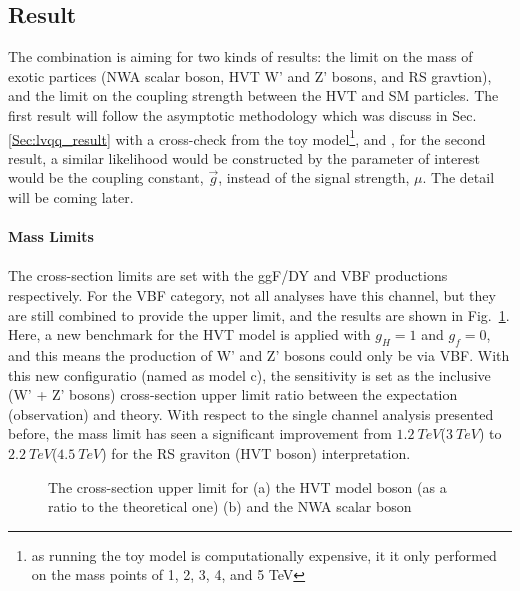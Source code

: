 \subsection{Result}
The combination is aiming for two kinds of results: the limit on the mass of exotic partices (NWA scalar boson, HVT W' and Z' bosons, and RS gravtion), and the limit on the coupling strength between the HVT and SM particles. The first result will follow the asymptotic methodology which was discuss in Sec.\ref{Sec:lvqq_result} with a cross-check from the toy model\footnote{as running the toy model is computationally expensive, it it only performed on the mass points of 1, 2, 3, 4, and 5 TeV}, and , for the second result, a similar likelihood would be constructed by the parameter of interest would be the coupling constant, $\vec{g}$, instead of the signal strength, $\mu$. The detail will be coming later. 
\\
\\{\bf Mass Limits}
\\
\\The cross-section limits are set with the ggF/DY and VBF productions respectively. For the VBF category, not all analyses have this channel, but they are still combined to provide the upper limit, and the results are shown in Fig.~\ref{Fig:limit_VBF_comb}. Here, a new benchmark for the HVT model is applied with $g_{H}=1$ and $g_{f}=0$, and this means the production of W' and Z' bosons could only be via VBF. With this new configuratio (named as model c), the sensitivity is set as the inclusive (W' + Z' bosons) cross-section upper limit ratio between the expectation (observation) and theory. With respect to the single channel analysis presented before, the mass limit has seen a significant improvement from $1.2~TeV$($3~TeV$) to $2.2~TeV$($4.5~TeV$) for the RS graviton (HVT boson) interpretation.   
\begin{figure}[ht]
	\centering
	\caption{The cross-section upper limit for (a) the HVT model boson (as a ratio to the theoretical one) (b) and the NWA scalar boson }
	\label{Fig:limit_VBF_comb}
\end{figure}
